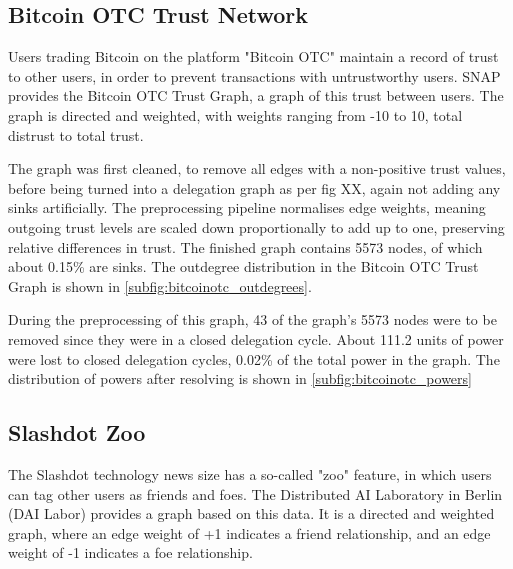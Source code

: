 
\subsection{Bitcoin OTC Trust Network}

Users trading Bitcoin on the platform "Bitcoin OTC" maintain a record of trust to other users, in order to prevent transactions with untrustworthy users. SNAP provides the Bitcoin OTC Trust Graph, a graph of this trust between users.  The graph is directed and weighted, with weights ranging from -10 to 10, total distrust to total trust.  

The graph was first cleaned, to remove all edges with a non-positive trust values, before being turned into a delegation graph as per fig XX, again not adding any sinks artificially. The preprocessing pipeline normalises edge weights, meaning outgoing trust levels are scaled down proportionally to add up to one, preserving relative differences in trust. The finished graph contains 5573 nodes, of which about 0.15\% are sinks. The outdegree distribution in the Bitcoin OTC Trust Graph is shown in \cref{subfig:bitcoinotc_outdegrees}.

During the preprocessing of this graph, 43 of the graph's 5573 nodes were to be removed since they were in a closed delegation cycle. About 111.2 units of power were lost to closed delegation cycles,  0.02\% of the total power in the graph. The distribution of powers after resolving is shown in \cref{subfig:bitcoinotc_powers}

\subsection{Slashdot Zoo}

The Slashdot technology news size has a so-called "zoo" feature, in which users can tag other users as friends and foes.  The Distributed AI Laboratory in Berlin (DAI Labor) provides a graph based on this data.  It is a directed and weighted graph, where an edge weight of +1 indicates a friend relationship, and an edge weight of -1 indicates a foe relationship.

